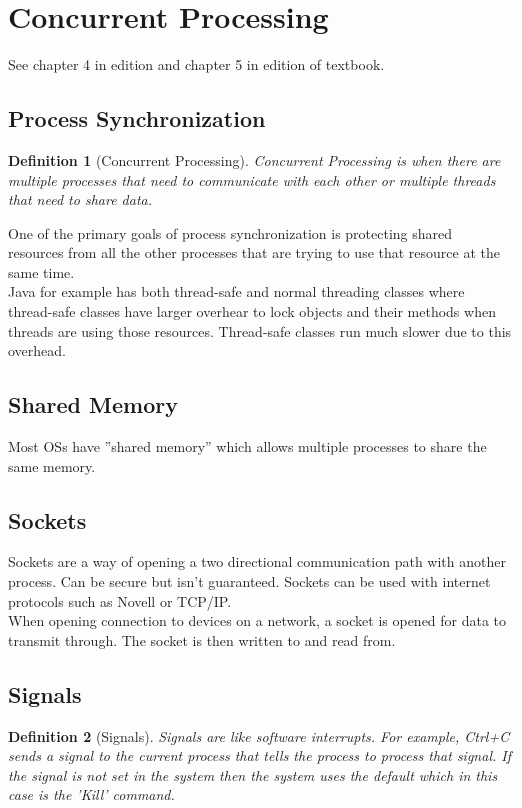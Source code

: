 \documentclass{report}
\newtheorem*{defn}{Definition}
\begin{document}
\section{Concurrent Processing}
See chapter 4 in  edition and chapter 5 in  edition of textbook.\\

\subsection{Process Synchronization}
\begin{defn}[Concurrent Processing] Concurrent Processing is when there are multiple processes that need to communicate with each other or multiple threads that need to share data.
\end{defn}
\noindent
One of the primary goals of process synchronization is protecting shared resources from all the other processes that are trying to use that resource at the same time.\\

Java for example has both thread-safe and normal threading classes where thread-safe classes have larger overhear to lock objects and their methods when threads are using those resources. Thread-safe classes run much slower due to this overhead.\\


\subsection{Shared Memory}
Most OSs have ''shared memory'' which allows multiple processes to share the same memory.\\

\subsection{Sockets}
Sockets are a way of opening a two directional communication path with another process. Can be secure but isn't guaranteed. Sockets can be used with internet protocols such as Novell or TCP/IP.\\

When opening connection to devices on a network, a socket is opened for data to transmit through. The socket is then written to and read from.\\

\subsection{Signals}
\begin{defn}[Signals]Signals are like software interrupts. For example, Ctrl+C sends a signal to the current process that tells the process to process that signal. If the signal is not set in the system then the system uses the default which in this case is the 'Kill' command.
\end{defn}
\end{document}
